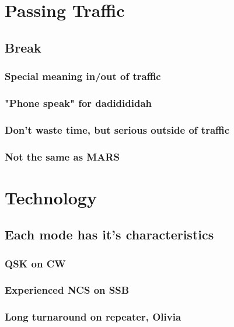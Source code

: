 \documentclass[11pt]{article}
\begin{document}
\section{Passing Traffic}
\label{sec-4}

\subsection{Break}
\label{sec-4.1}

\subsubsection{Special meaning in/out of traffic}
\label{sec-4.1.1}

\subsubsection{"Phone speak" for dadidididah}
\label{sec-4.1.2}

\subsubsection{Don't waste time, but serious outside of traffic}
\label{sec-4.1.3}

\subsubsection{Not the same as MARS}
\label{sec-4.1.4}

\section{Technology}
\label{sec-5}

\subsection{Each mode has it's characteristics}
\label{sec-5.1}

\subsubsection{QSK on CW}
\label{sec-5.1.1}

\subsubsection{Experienced NCS on SSB}
\label{sec-5.1.2}

\subsubsection{Long turnaround on repeater, Olivia}
\label{sec-5.1.3}
\end{document}
